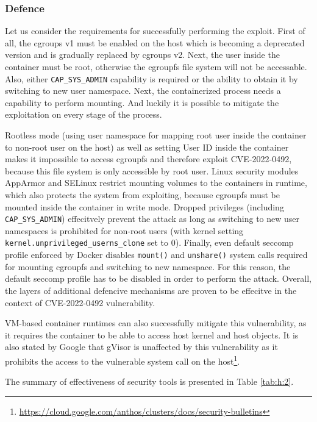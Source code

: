 

\subsubsection*{Defence}
Let us consider the requirements for successfully performing the exploit. First of all, the cgroups v1 must be enabled on the host which is becoming a deprecated version and is gradually replaced by cgroups v2. Next, the user inside the container must be root, otherwise the cgroupfs file system will not be accessable. Also, either \texttt{CAP\_SYS\_ADMIN} capability is required or the ability to obtain it by switching to new user namespace. Next, the containerized process needs a capability to perform mounting. And luckily it is possible to mitigate the exploitation on every stage of the process.

Rootless mode (using user namespace for mapping root user inside the container to non-root user on the host) as well as setting User ID inside the container makes it impossible to access cgroupfs and therefore exploit CVE-2022-0492, because this file system is only accessible by root user. Linux security modules AppArmor and SELinux restrict mounting volumes to the containers in runtime, which also protects the system from exploiting, because cgroupfs must be mounted inside the container in write mode. Dropped privileges (including \texttt{CAP\_SYS\_ADMIN}) effecitvely prevent the attack as long as switching to new user namespaces is prohibited for non-root users (with kernel setting \texttt{kernel.unprivileged\_userns\_clone} set to 0). Finally, even default seccomp profile enforced by Docker disables \texttt{mount()} and \texttt{unshare()} system calls required for mounting cgroupfs and switching to new namespace. For this reason, the default seccomp profile has to be disabled in order to perform the attack. Overall, the layers of additional defencive mechanisms are proven to be effecitve in the context of CVE-2022-0492 vulnerability.

VM-based container runtimes can also successfully mitigate this vulnerability, as it requires the container to be able to access host kernel and host objects. It is also stated by Google that gVisor is unaffected by this vulnerability as it prohibits the access to the vulnerable system call on the host\footnote{\url{https://cloud.google.com/anthos/clusters/docs/security-bulletins}}.

The summary of effectiveness of security tools is presented in Table \ref{tab:h:2}.

